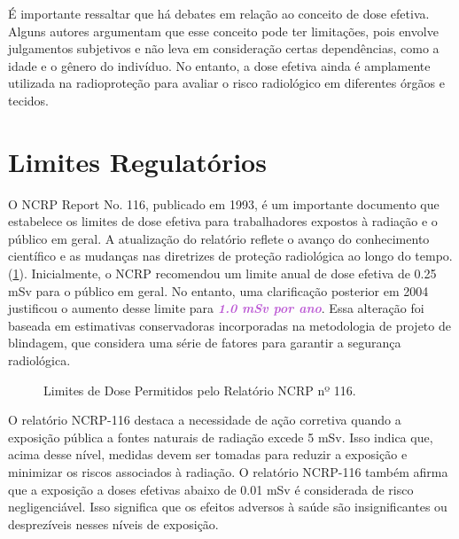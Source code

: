 \documentclass[11pt,a4paper]{article}
\begin{document}
	É importante ressaltar que há debates em relação ao conceito de dose efetiva. Alguns autores argumentam que esse conceito pode ter limitações, pois envolve julgamentos subjetivos e não leva em consideração certas dependências, como a idade e o gênero do indivíduo. No entanto, a dose efetiva ainda é amplamente utilizada na radioproteção para avaliar o risco radiológico em diferentes órgãos e tecidos.


\section{Limites Regulatórios}

	O NCRP Report No. 116, publicado em 1993, é um importante documento que estabelece os limites de dose efetiva para trabalhadores expostos à radiação e o público em geral. A atualização do relatório reflete o avanço do conhecimento científico e as mudanças nas diretrizes de proteção radiológica ao longo do tempo.(\ref{fig:prLimitesAnuais}).  Inicialmente, o NCRP recomendou um limite anual de dose efetiva de 0.25 mSv para o público em geral. No entanto, uma clarificação posterior em 2004 justificou o aumento desse limite para \textcolor{MediumOrchid}{\textbf{\textit{1.0 mSv por ano}}}. Essa alteração foi baseada em estimativas conservadoras incorporadas na metodologia de projeto de blindagem, que considera uma série de fatores para garantir a segurança radiológica.

	\begin{figure}[!h]
			\centering
			\caption{Limites de Dose Permitidos pelo Relatório NCRP nº 116.}
			\label{fig:prLimitesAnuais}
	\end{figure}

	O relatório NCRP-116 destaca a necessidade de ação corretiva quando a exposição pública a fontes naturais de radiação excede 5 mSv. Isso indica que, acima desse nível, medidas devem ser tomadas para reduzir a exposição e minimizar os riscos associados à radiação. O relatório NCRP-116 também afirma que a exposição a doses efetivas abaixo de 0.01 mSv é considerada de risco negligenciável. Isso significa que os efeitos adversos à saúde são insignificantes ou desprezíveis nesses níveis de exposição.
\end{document}
